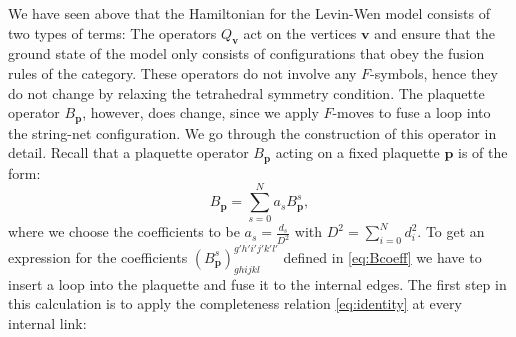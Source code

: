 We have seen above that the Hamiltonian for the Levin-Wen model consists of two types of terms: The operators $Q_\mathbf{v}$ act on the vertices $\mathbf{v}$ and ensure that the ground state of the model only consists of configurations that obey the fusion rules of the category. These operators do not involve any $F$-symbols, hence they do not change by relaxing the tetrahedral symmetry condition. The plaquette operator $B_\mathbf{p}$, however, does change, since we apply $F$-moves to fuse a loop into the string-net configuration. We go through the construction of this operator in detail. Recall that a plaquette operator $B_\mathbf{p}$ acting on a fixed plaquette $\mathbf{p}$ is of the form:
	\begin{equation}
		B_\mathbf{p}=\sum_{s=0}^Na_s B_\mathbf{p}^s,
	\end{equation}
where we choose the coefficients to be $a_s=\frac{d_s}{D^2}$ with $D^2=\sum_{i=0}^Nd_i^2$. To get an expression for the coefficients $\left(B_\mathbf{p}^s\right)_{ghijkl}^{g'h'i'j'k'l'}$ defined in \cref{eq:Bcoeff} we have to insert a loop into the plaquette and fuse it to the internal edges. The first step in this calculation is to apply the completeness relation \cref{eq:identity} at every internal link:

